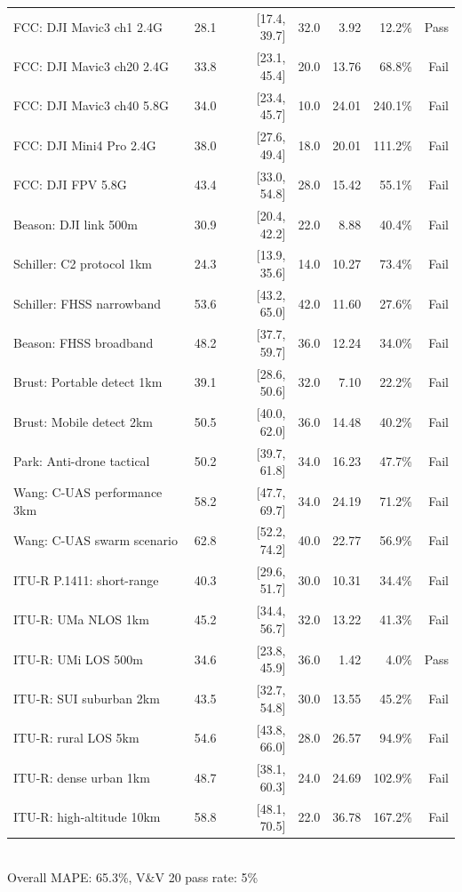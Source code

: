 \begin{table}[htbp]
\begin{tabular}{lrrrrrr}
FCC: DJI Mavic3 ch1 2.4G & 28.1 & [17.4, 39.7] & 32.0 & 3.92 & 12.2\% & Pass \\
FCC: DJI Mavic3 ch20 2.4G & 33.8 & [23.1, 45.4] & 20.0 & 13.76 & 68.8\% & Fail \\
FCC: DJI Mavic3 ch40 5.8G & 34.0 & [23.4, 45.7] & 10.0 & 24.01 & 240.1\% & Fail \\
FCC: DJI Mini4 Pro 2.4G & 38.0 & [27.6, 49.4] & 18.0 & 20.01 & 111.2\% & Fail \\
FCC: DJI FPV 5.8G & 43.4 & [33.0, 54.8] & 28.0 & 15.42 & 55.1\% & Fail \\
Beason: DJI link 500m & 30.9 & [20.4, 42.2] & 22.0 & 8.88 & 40.4\% & Fail \\
Schiller: C2 protocol 1km & 24.3 & [13.9, 35.6] & 14.0 & 10.27 & 73.4\% & Fail \\
Schiller: FHSS narrowband & 53.6 & [43.2, 65.0] & 42.0 & 11.60 & 27.6\% & Fail \\
Beason: FHSS broadband & 48.2 & [37.7, 59.7] & 36.0 & 12.24 & 34.0\% & Fail \\
Brust: Portable detect 1km & 39.1 & [28.6, 50.6] & 32.0 & 7.10 & 22.2\% & Fail \\
Brust: Mobile detect 2km & 50.5 & [40.0, 62.0] & 36.0 & 14.48 & 40.2\% & Fail \\
Park: Anti-drone tactical & 50.2 & [39.7, 61.8] & 34.0 & 16.23 & 47.7\% & Fail \\
Wang: C-UAS performance 3km & 58.2 & [47.7, 69.7] & 34.0 & 24.19 & 71.2\% & Fail \\
Wang: C-UAS swarm scenario & 62.8 & [52.2, 74.2] & 40.0 & 22.77 & 56.9\% & Fail \\
ITU-R P.1411: short-range & 40.3 & [29.6, 51.7] & 30.0 & 10.31 & 34.4\% & Fail \\
ITU-R: UMa NLOS 1km & 45.2 & [34.4, 56.7] & 32.0 & 13.22 & 41.3\% & Fail \\
ITU-R: UMi LOS 500m & 34.6 & [23.8, 45.9] & 36.0 & 1.42 & 4.0\% & Pass \\
ITU-R: SUI suburban 2km & 43.5 & [32.7, 54.8] & 30.0 & 13.55 & 45.2\% & Fail \\
ITU-R: rural LOS 5km & 54.6 & [43.8, 66.0] & 28.0 & 26.57 & 94.9\% & Fail \\
ITU-R: dense urban 1km & 48.7 & [38.1, 60.3] & 24.0 & 24.69 & 102.9\% & Fail \\
ITU-R: high-altitude 10km & 58.8 & [48.1, 70.5] & 22.0 & 36.78 & 167.2\% & Fail \\
\bottomrule
\end{tabular}
\\[2pt]
\footnotesize{Overall MAPE: 65.3\%, V\&V 20 pass rate: 5\%}
\end{table}
